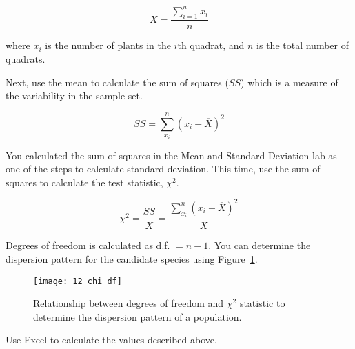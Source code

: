 \documentclass[12pt, hidelinks]{exam}
\newcommand\chisq{$\chi^2$}
\begin{document}
\[\overline{X} = \dfrac{\sum\limits_{i=1}^n x_i}{n}\]

where $x_i$ is the number of plants in the $i\mathrm{th}$ quadrat, and $n$ is the total number of quadrats.


Next, use the mean to calculate the sum of squares ($SS$) which is a measure of the variability in the sample set.  

\[SS =  \sum\limits_{x_i}^n (x_i - \overline{X})^2 \]


You calculated the sum of squares in the Mean and Standard Deviation lab as one of the steps to calculate standard deviation. This time, use the sum of squares to calculate the test statistic, \chisq{}. 

\[ \chi^2 = \dfrac{SS}{\overline{X}} = \dfrac{\sum\limits_{x_i}^n (x_i - \overline{X})^2}{\overline{X}}\]

Degrees of freedom is calculated as d.f. $= n-1.$  You can determine the dispersion pattern for the candidate species using Figure~\ref{fig:chi_df}.  

\begin{figure}[h!]
	\begin{center}
	\captionsetup{width=0.5\textwidth}
	\texttt{[image: 12\_chi\_df]}
	\caption{Relationship between degrees of freedom and \chisq{}
statistic to determine the dispersion pattern of a
population.}\label{fig:chi_df}
	\end{center}
\end{figure}

Use Excel to calculate the values described above.
\end{document}
